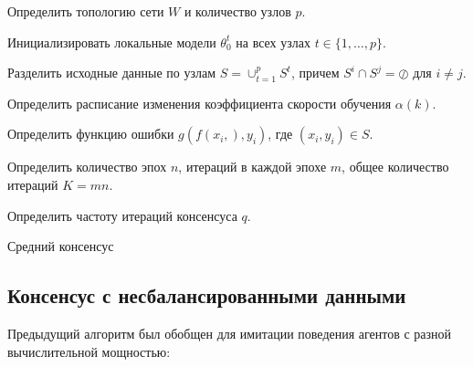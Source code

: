 \documentclass[a4paper,article,14pt]{extarticle}
\begin{document}
\begin{algorithm}[H]
\SetAlgoLined
Определить топологию сети $W$ и количество узлов $p$.

Инициализировать локальные модели $\theta_0^t$ на всех узлах $t \in \{ 1, \ldots, p \}$.

Разделить исходные данные по узлам $S = \cup_{t=1}^p S^t$, причем $S^i \cap S^j = \oslash$ для $i \ne j$.

Определить расписание изменения коэффициента скорости обучения $\alpha(k)$.

Определить функцию ошибки $g(f(x_i,),y_i)$, где $(x_i,y_i) \in S$.

Определить количество эпох $n$, итераций в каждой эпохе $m$, общее количество итераций $K=mn$.

Определить частоту итераций консенсуса $q$.

\caption{Средний консенсус}
\end{algorithm}



\subsection{Консенсус с несбалансированными данными}
Предыдущий алгоритм был обобщен для имитации поведения агентов с разной вычислительной мощностью:
\end{document}
